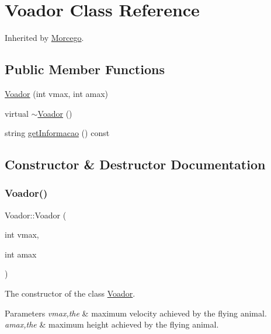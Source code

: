\hypertarget{class_voador}{}\section{Voador Class Reference}
\label{class_voador}


Inherited by \mbox{\hyperlink{class_morcego}{Morcego}}.

\subsection*{Public Member Functions}
\begin{DoxyCompactItemize}
\item 
\mbox{\hyperlink{class_voador_a2d9c0a73c5508d3885ce73d8ab114c32}{Voador}} (int vmax, int amax)
\item 
virtual \mbox{\hyperlink{class_voador_a5cb1869495940245ca67fb8aac11a85a}{$\sim$\+Voador}} ()
\item 
string \mbox{\hyperlink{class_voador_aabc57710b69459a3b1a41c3400ebc0a7}{get\+Informacao}} () const
\end{DoxyCompactItemize}


\subsection{Constructor \& Destructor Documentation}
\mbox{\label{class_voador_a2d9c0a73c5508d3885ce73d8ab114c32}} 
\subsubsection{\texorpdfstring{Voador()}{Voador()}}
{\footnotesize\ttfamily Voador\+::\+Voador (\begin{DoxyParamCaption}\item[{int}]{vmax,  }\item[{int}]{amax }\end{DoxyParamCaption})}

The constructor of the class \mbox{\hyperlink{class_voador}{Voador}}. 
\begin{DoxyParams}{Parameters}
{\em vmax,the} & maximum velocity achieved by the flying animal. \\
\hline
{\em amax,the} & maximum height achieved by the flying animal. \\
\hline
\end{DoxyParams}
\mbox{\label{class_voador_a5cb1869495940245ca67fb8aac11a85a}} 
